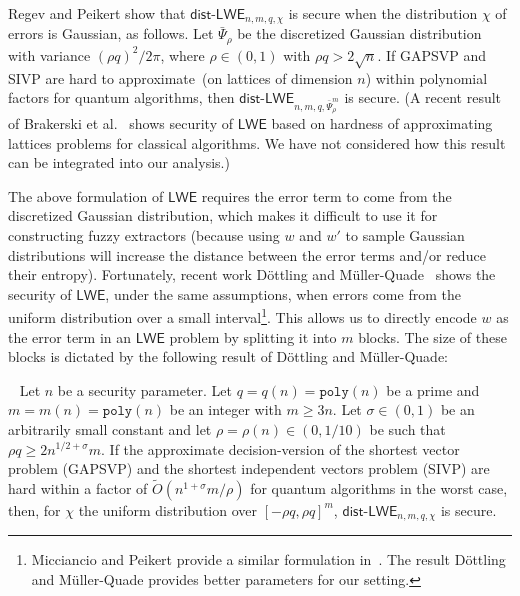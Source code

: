 \documentclass{llncs}
\newcommand{\class}[1]{{\ensuremath{\mathsf{#1}}}}
\newcommand{\poly}{\ensuremath{\mathtt{poly}}\xspace}
\newcommand{\lwe}{\class{LWE}}
\newcommand{\LWE}{\class{LWE}}
\newcommand{\distLWE}{\ensuremath{\class{dist\mbox{-}LWE}}}
\begin{document}
 Regev\cite{regev2005LWE} and Peikert \cite{peikert2009latticereduction} show that $\class{dist}$-$\lwe_{n, m, q, \chi}$ is secure when the distribution $\chi$ of errors is Gaussian, as follows.
Let $\bar{\Psi}_\rho$ be the discretized Gaussian distribution with variance $(\rho q)^2/2\pi$, where $\rho \in (0,1)$ with $\rho q > 2\sqrt{n}$.  If GAPSVP and SIVP are hard to approximate~(on lattices of dimension $n$) within polynomial factors for quantum algorithms, then $\distLWE_{n, m, q, \bar{\Psi}_\rho^m}$ is secure.  (A recent result of Brakerski et al.~\cite{brakerski2013classical} shows security of $\LWE$ based on hardness of approximating lattices problems for classical algorithms.  We have not considered how this result can be integrated into our analysis.)

The above formulation of $\LWE$ requires the error term to come from the discretized Gaussian distribution, which makes it difficult to use it for constructing fuzzy extractors (because using $w$ and $w'$ to sample Gaussian distributions will increase the distance between the error terms and/or reduce their entropy).
Fortunately, recent work D\"{o}ttling and M\"{u}ller-Quade~\cite{dottling2012} shows the security of $\LWE$, under the same assumptions, when errors come from the uniform distribution over a small interval\footnote{Micciancio and Peikert provide a similar formulation in~\cite{micciancio2013hardness}.  The result D\"{o}ttling and M\"{u}ller-Quade provides better parameters for our setting.}.  This allows us to directly encode $w$ as the error term in an $\LWE$ problem by splitting it  into $m$ blocks.  The size of these blocks is dictated by the following result of D\"{o}ttling and M\"{u}ller-Quade:
\begin{lemma}~
\label{lem:uniform LWE decision}
Let $n$ be a security parameter.  Let $q = q(n) = \poly(n)$ be a prime and $m = m(n) = \poly(n)$ be an integer with $m\ge 3n$. Let $\sigma \in (0, 1)$ be an arbitrarily small  constant and let $\rho=\rho(n)\in (0,1/10)$ be such that $\rho q \geq 2n^{1/2+\sigma}m$. If the approximate decision-version of the shortest vector problem (GAPSVP) and the shortest independent vectors problem (SIVP) are hard within a factor of $\tilde{O}(n^{1+\sigma}m/\rho)$ for quantum algorithms in the worst case, then, for $\chi$ the uniform distribution over $[-\rho q, \rho q]^m$,  $\distLWE_{n, m, q, \chi}$ is secure.
\end{lemma}
\end{document}
